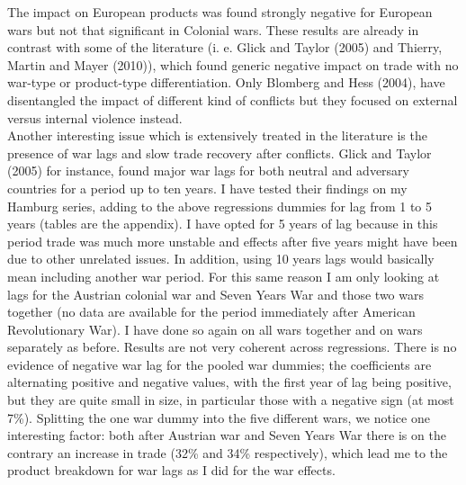 \documentclass[12pt,a4paper,titlepage]{article}
\begin{document}
The impact on European products was found strongly negative for European wars but not that significant in Colonial wars. These results are already in contrast with some of the literature (i. e. Glick and Taylor (2005) and Thierry, Martin and Mayer (2010)), which found generic negative impact on trade with no war-type or product-type differentiation. Only Blomberg and Hess (2004), have disentangled the impact of different kind of conflicts but they focused on external versus internal violence instead.\\
Another interesting issue which is extensively treated in the literature is the presence of war lags and slow trade recovery after conflicts. Glick and Taylor (2005) for instance, found major war lags for both neutral and adversary countries for a period up to ten years. I have tested their findings on my Hamburg series, adding to the above regressions dummies for lag from 1 to 5 years (tables are the appendix). I have opted for 5 years of lag because in this period trade was much more unstable and effects after five years might have been due to other unrelated issues. In addition, using 10 years lags would basically mean including another war period. For this same reason I am only looking at lags for the Austrian colonial war and Seven Years War and those two wars together (no data are available for the period immediately after American Revolutionary War). I have done so again on all wars together and on wars separately as before. Results are not very coherent across regressions. 
There is no evidence of negative war lag for the pooled war dummies; the coefficients are alternating positive and negative values, with the first year of lag being positive, but they are quite small in size, in particular those with a negative sign (at most 7\%). Splitting the one war dummy into the five different wars, we notice one interesting factor: both after Austrian war and Seven Years War there is on the contrary an increase in trade (32\% and 34\% respectively), which lead me to the product breakdown for war lags as I did for the war effects. \\
\end{document}
